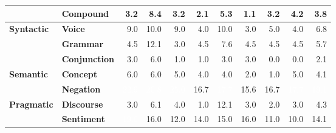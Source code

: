 \begin{table}[h]
{\begin{tabular}{llrrrrrrrrr}
  & \textbf{Compound} & \cellcolor{blue!8} 3.2 & \cellcolor{blue!22} 8.4 & \cellcolor{blue!8} 3.2 & \cellcolor{blue!5} 2.1 & \cellcolor{blue!14} 5.3 & \cellcolor{blue!3} 1.1 & \cellcolor{blue!8} 3.2 & \cellcolor{blue!11} 4.2 & \cellcolor{blue!10} 3.8 \\
\midrule
\textbf{Syntactic} & \textbf{Voice} & \cellcolor{blue!23} 9.0 & \cellcolor{blue!26} 10.0 & \cellcolor{blue!23} 9.0 & \cellcolor{blue!10} 4.0 & \cellcolor{blue!26} 10.0 & \cellcolor{blue!8} 3.0 & \cellcolor{blue!13} 5.0 & \cellcolor{blue!10} 4.0 & \cellcolor{blue!17} 6.8 \\
  & \textbf{Grammar} & \cellcolor{blue!12} 4.5 & \cellcolor{blue!31} 12.1 & \cellcolor{blue!8} 3.0 & \cellcolor{blue!12} 4.5 & \cellcolor{blue!20} 7.6 & \cellcolor{blue!12} 4.5 & \cellcolor{blue!12} 4.5 & \cellcolor{blue!12} 4.5 & \cellcolor{blue!15} 5.7 \\
  & \textbf{Conjunction} & \cellcolor{blue!8} 3.0 & \cellcolor{blue!15} 6.0 & \cellcolor{blue!3} 1.0 & \cellcolor{blue!3} 1.0 & \cellcolor{blue!8} 3.0 & \cellcolor{blue!8} 3.0 & \cellcolor{blue!0} 0.0 & \cellcolor{blue!0} 0.0 & \cellcolor{blue!5} 2.1 \\
\midrule
\textbf{Semantic} & \textbf{Concept} & \cellcolor{blue!15} 6.0 & \cellcolor{blue!15} 6.0 & \cellcolor{blue!13} 5.0 & \cellcolor{blue!10} 4.0 & \cellcolor{blue!10} 4.0 & \cellcolor{blue!5} 2.0 & \cellcolor{blue!3} 1.0 & \cellcolor{blue!13} 5.0 & \cellcolor{blue!11} 4.1 \\
  & \textbf{Negation} & \cellcolor{blue!59} \textcolor{white}{22.9} & \cellcolor{blue!54} \textcolor{white}{20.8} & \cellcolor{blue!65} \textcolor{white}{25.0} & \cellcolor{blue!43} 16.7 & \cellcolor{blue!46} \textcolor{white}{17.7} & \cellcolor{blue!40} 15.6 & \cellcolor{blue!43} 16.7 & \cellcolor{blue!46} \textcolor{white}{17.7} & \cellcolor{blue!49} \textcolor{white}{19.1} \\
\midrule
\textbf{Pragmatic} & \textbf{Discourse} & \cellcolor{blue!8} 3.0 & \cellcolor{blue!16} 6.1 & \cellcolor{blue!10} 4.0 & \cellcolor{blue!3} 1.0 & \cellcolor{blue!31} 12.1 & \cellcolor{blue!8} 3.0 & \cellcolor{blue!5} 2.0 & \cellcolor{blue!8} 3.0 & \cellcolor{blue!11} 4.3 \\
  & \textbf{Sentiment} & \cellcolor{blue!49} \textcolor{white}{19.0} & \cellcolor{blue!41} 16.0 & \cellcolor{blue!31} 12.0 & \cellcolor{blue!36} 14.0 & \cellcolor{blue!39} 15.0 & \cellcolor{blue!41} 16.0 & \cellcolor{blue!28} 11.0 & \cellcolor{blue!26} 10.0 & \cellcolor{blue!36} 14.1 \\

\end{tabular}}
\end{table}

